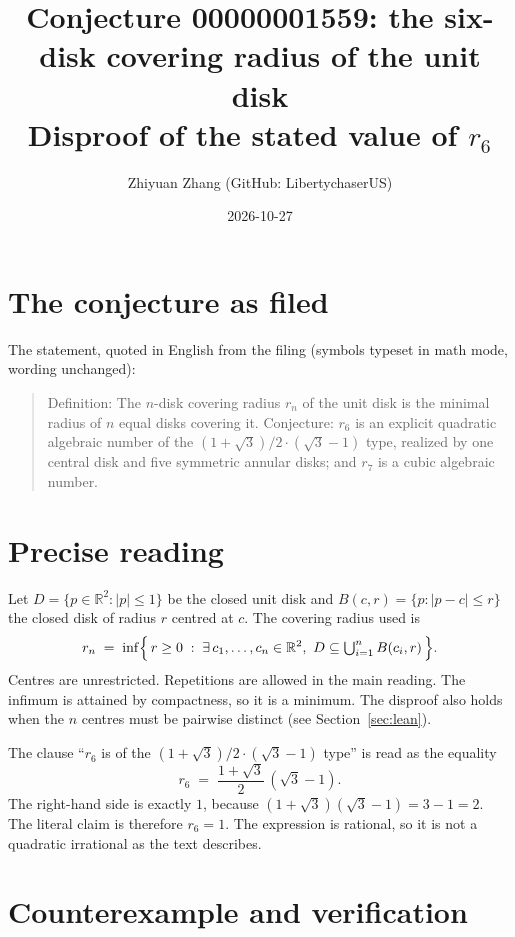 \documentclass[11pt]{article}
\title{Conjecture 00000001559: the six-disk covering radius of the unit disk\\
\large Disproof of the stated value of $r_6$}
\author{Zhiyuan Zhang (GitHub: LibertychaserUS)}
\date{2026-10-27}
\theoremstyle{definition}
\theoremstyle{plain}
\begin{document}
\maketitle

\section{The conjecture as filed}

The statement, quoted in English from the filing (symbols typeset in math mode, wording unchanged):

\begin{quote}
Definition: The $n$-disk covering radius $r_n$ of the unit disk is the minimal radius of $n$ equal disks covering it. Conjecture: $r_6$ is an explicit quadratic algebraic number of the $(1+\sqrt{3})/2\cdot(\sqrt{3}-1)$ type, realized by one central disk and five symmetric annular disks; and $r_7$ is a cubic algebraic number.
\end{quote}

\section{Precise reading}

Let $D=\{p\in\mathbb{R}^2 : |p|\le 1\}$ be the closed unit disk and $B(c,r)=\{p : |p-c|\le r\}$ the closed disk of radius $r$ centred at $c$. The covering radius used is
\begin{equation}
  r_n \;=\; \inf\Bigl\{\, r\ge 0 \;:\; \exists\, c_1,\dots,c_n\in\mathbb{R}^2,\ D\subseteq \textstyle\bigcup_{i=1}^n B(c_i,r)\,\Bigr\}.
\end{equation}
Centres are unrestricted. Repetitions are allowed in the main reading. The infimum is attained by compactness, so it is a minimum. The disproof also holds when the $n$ centres must be pairwise distinct (see Section~\ref{sec:lean}).

The clause ``$r_6$ is of the $(1+\sqrt{3})/2\cdot(\sqrt{3}-1)$ type'' is read as the equality
\[
  r_6 \;=\; \frac{1+\sqrt{3}}{2}\,(\sqrt{3}-1).
\]
The right-hand side is exactly $1$, because $(1+\sqrt3)(\sqrt3-1)=3-1=2$. The literal claim is therefore $r_6=1$. The expression is rational, so it is not a quadratic irrational as the text describes.

\section{Counterexample and verification}
\end{document}
